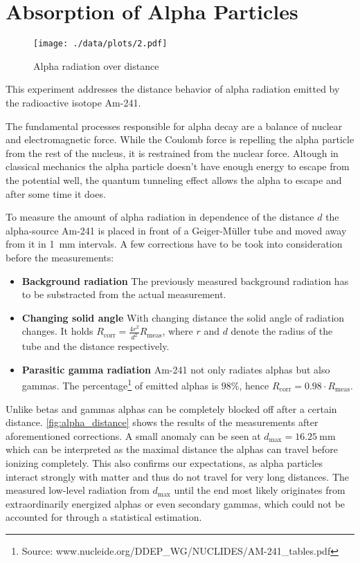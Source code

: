 \chapter{Absorption of Alpha Particles}
\begin{figure}[ht!]
	\centering
	\texttt{[image: ./data/plots/2.pdf]}
	\caption[Alpha radiation over distance]{Alpha radiation over distance}
	\label{fig:alpha_distance}
\end{figure}

This experiment addresses the distance behavior of alpha radiation emitted by the radioactive isotope Am-241.

The fundamental processes responsible for alpha decay are a balance of nuclear and electromagnetic force.
While the Coulomb force is repelling the alpha particle from the rest of the nucleus, it is restrained from the nuclear force.
Altough in classical mechanics the alpha particle doesn't have enough energy to escape from the potential well, the quantum tunneling effect allows the alpha to escape and after some time it does.

To measure the amount of alpha radiation in dependence of the distance $d$ the alpha-source Am-241 is placed in front of a Geiger-Müller tube and moved away from it in \SI{1}{\milli\meter} intervals.
A few corrections have to be took into consideration before the measurements:
\begin{itemize}
	\item \textbf{Background radiation} The previously measured background radiation has to be substracted from the actual measurement.
	\item \textbf{Changing solid angle} With changing distance the solid angle of radiation changes. It holds $R_\text{corr}=\frac{4r^2}{d^2}R_\text{meas}$, where $r$ and $d$ denote the radius of the tube and the distance respectively.
	\item \textbf{Parasitic gamma radiation} Am-241 not only radiates alphas but also gammas. The percentage\footnote{Source: www.nucleide.org/DDEP\_WG/NUCLIDES/AM-241\_tables.pdf} of emitted alphas is $\num{98}\%$, hence $R_\text{corr}=0.98\cdot R_\text{meas}$.
\end{itemize}

Unlike betas and gammas alphas can be completely blocked off after a certain distance.
\autoref{fig:alpha_distance} shows the results of the measurements after aforementioned corrections.
A small anomaly can be seen at $d_\text{max}=\SI{16.25}{\milli\meter}$ which can be interpreted as the maximal distance the alphas can travel before ionizing completely.
This also confirms our expectations, as alpha particles interact strongly with matter and thus do not travel for very long distances.
The measured low-level radiation from $d_\text{max}$ until the end most likely originates from extraordinarily energized alphas or even secondary gammas, which could not be accounted for through a statistical estimation.

